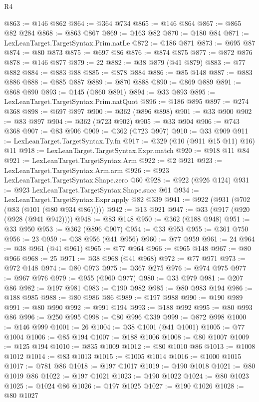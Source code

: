 \begin{lexlean}{R4}
\begin{coremodule}
@863 := @146 @862
@864 := @364 @734
@865 := @146 @864
@867 := @865 @82 @284
@868 := @863 @867
@869 := @163 @82
@870 := @180 @84
@871 := LexLeanTarget.TargetSyntax.Prim.natLe
@872 := @186 @871
@873 := @695 @87
@874 := @80 @873
@875 := @697 @86
@876 := @874 @875
@877 := @872 @876
@878 := @146 @877
@879 := 22
@882 := @38 @879 (@41 @879)
@883 := @77 @882
@884 := @883 @88
@885 := @878 @884
@886 := @85 @148
@887 := @883 @886
@888 := @885 @887
@889 := @870 @888
@890 := @869 @889
@891 := @868 @890
@893 := @145 (@860 @891)
@894 := @33 @893
@895 := LexLeanTarget.TargetSyntax.Prim.natQuot
@896 := @186 @895
@897 := @274 @368
@898 := @697 @897
@900 := @362 (@896 @898)
@901 := @33 @900
@902 := @83 @897
@904 := @362 (@723 @902)
@905 := @33 @904
@906 := @743 @368
@907 := @83 @906
@909 := @362 (@723 @907)
@910 := @33 @909
@911 := LexLeanTarget.TargetSyntax.Ty.fn
@917 := @329 (@10 (@911 @15 @11) @16) @11
@918 := LexLeanTarget.TargetSyntax.Expr.match
@920 := @918 @11 @84
@921 := LexLeanTarget.TargetSyntax.Arm
@922 := @2 @921
@923 := LexLeanTarget.TargetSyntax.Arm.arm
@926 := @923 LexLeanTarget.TargetSyntax.Shape.zero @60
@928 := @922 (@926 @124)
@931 := @923 LexLeanTarget.TargetSyntax.Shape.succ @61
@934 := LexLeanTarget.TargetSyntax.Expr.apply @82 @339
@941 := @922 (@931 (@702 (@83 (@101 (@80 @934 @86)))))
@942 := @13 @921
@947 := @33 (@917 (@920 (@928 (@941 @942))))
@948 := @83 @148
@950 := @362 (@188 @948)
@951 := @33 @950
@953 := @362 (@896 @907)
@954 := @33 @953
@955 := @361 @750
@956 := 23
@959 := @38 @956 (@41 @956)
@960 := @77 @959
@961 := 24
@964 := @38 @961 (@41 @961)
@965 := @77 @964
@966 := @965 @148
@967 := @80 @966
@968 := 25
@971 := @38 @968 (@41 @968)
@972 := @77 @971
@973 := @972 @148
@974 := @80 @973
@975 := @367 @275
@976 := @974 @975
@977 := @967 @976
@979 := @955 (@960 @977)
@980 := @33 @979
@981 := @207 @86
@982 := @197 @981
@983 := @190 @982
@985 := @80 @983 @194
@986 := @188 @985
@988 := @80 @986 @86
@989 := @197 @988
@990 := @190 @989
@991 := @80 @990
@992 := @991 @194
@993 := @188 @992
@995 := @80 @993 @86
@996 := @250 @995
@998 := @80 @996 @339
@999 := @872 @998
@1000 := @146 @999
@1001 := 26
@1004 := @38 @1001 (@41 @1001)
@1005 := @77 @1004
@1006 := @85 @194
@1007 := @188 @1006
@1008 := @80 @1007
@1009 := @125 @194
@1010 := @835 @1009
@1012 := @80 @1010 @86
@1013 := @1008 @1012
@1014 := @83 @1013
@1015 := @1005 @1014
@1016 := @1000 @1015
@1017 := @781 @86
@1018 := @197 @1017
@1019 := @190 @1018
@1021 := @80 @1019 @86
@1022 := @197 @1021
@1023 := @190 @1022
@1024 := @80 @1023
@1025 := @1024 @86
@1026 := @197 @1025
@1027 := @190 @1026
@1028 := @80 @1027

\end{coremodule}
\end{lexlean}
